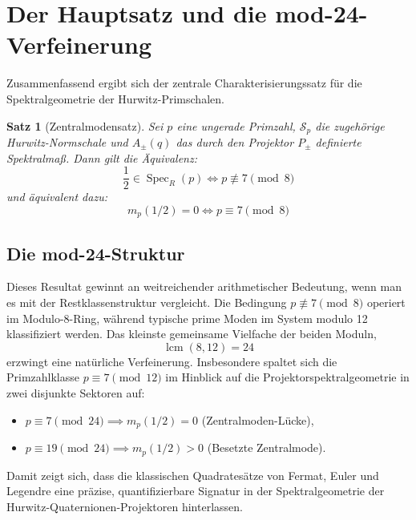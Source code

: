 \documentclass[11pt,a4paper]{article}
\newtheorem{satz}{Satz}[section]
\begin{document}
\section{Der Hauptsatz und die mod-24-Verfeinerung}

Zusammenfassend ergibt sich der zentrale Charakterisierungssatz für die Spektralgeometrie der Hurwitz-Primschalen.

\begin{satz}[Zentralmodensatz]
Sei $p$ eine ungerade Primzahl, $\mathcal{S}_p$ die zugehörige Hurwitz-Normschale und $A_\pm(q)$ das durch den Projektor $P_\pm$ definierte Spektralmaß. Dann gilt die Äquivalenz:
$$\frac{1}{2} \in \operatorname{Spec}_R(p) \iff p \not\equiv 7 \pmod 8$$
und äquivalent dazu:
$$m_p(1/2) = 0 \iff p \equiv 7 \pmod 8$$
\end{satz}

\subsection*{Die mod-24-Struktur}
Dieses Resultat gewinnt an weitreichender arithmetischer Bedeutung, wenn man es mit der Restklassenstruktur vergleicht. Die Bedingung $p \not\equiv 7 \pmod 8$ operiert im Modulo-8-Ring, während typische prime Moden im System modulo 12 klassifiziert werden. Das kleinste gemeinsame Vielfache der beiden Moduln,
$$\operatorname{lcm}(8, 12) = 24$$
erzwingt eine natürliche Verfeinerung. Insbesondere spaltet sich die Primzahlklasse $p \equiv 7 \pmod{12}$ im Hinblick auf die Projektorspektralgeometrie in zwei disjunkte Sektoren auf:
\begin{itemize}
    \item $p \equiv 7 \pmod{24} \implies m_p(1/2) = 0$ (Zentralmoden-Lücke),
    \item $p \equiv 19 \pmod{24} \implies m_p(1/2) > 0$ (Besetzte Zentralmode).
\end{itemize}

Damit zeigt sich, dass die klassischen Quadratesätze von Fermat, Euler und Legendre eine präzise, quantifizierbare Signatur in der Spektralgeometrie der Hurwitz-Quaternionen-Projektoren hinterlassen.
\end{document}
